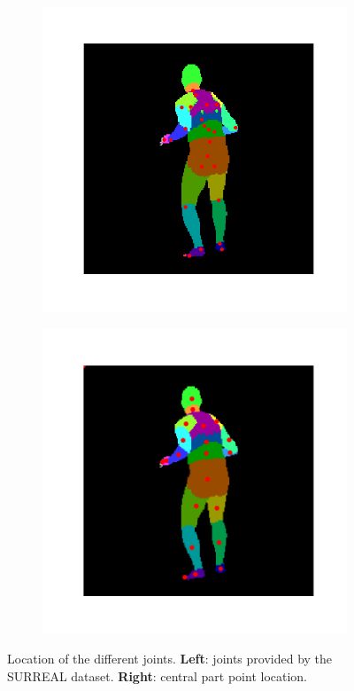 \documentclass[12pt,a4paper]{article}
\begin{document}
\begin{figure}
\centering
\centering
\begin{subfigure}{.5\textwidth}
\centering
  \includegraphics[scale=0.5]{surreal_joints.png}
\end{subfigure}
\begin{subfigure}{.45\textwidth}
  \centering
  \includegraphics[scale=0.3]{central_point_parts.png}
\end{subfigure}
\caption{Location of the different joints. \textbf{Left}: joints provided by the SURREAL dataset. \textbf{Right}: central part point location.}
\label{hourglass:joints}
\end{figure}
\end{document}
